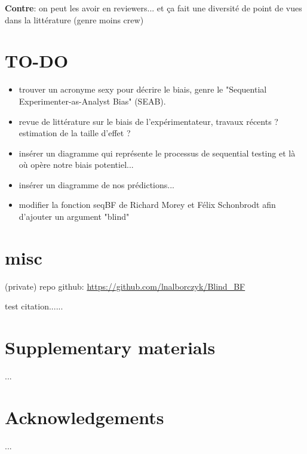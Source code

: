 \documentclass[a4paper,man,natbib]{apa6}
\begin{document}
\textbf{Contre}: on peut les avoir en reviewers... et ça fait une diversité de point de vues dans la littérature (genre moins crew)

\section{TO-DO}

\begin{itemize}

\item{trouver un acronyme sexy pour décrire le biais, genre le "Sequential Experimenter-as-Analyst Bias" (SEAB).}

\item{revue de littérature sur le biais de l'expérimentateur, travaux récents ? estimation de la taille d'effet ?}

\item{insérer un diagramme qui représente le processus de sequential testing et là où opère notre biais potentiel...}

\item{insérer un diagramme de nos prédictions...}

\item{modifier la fonction seqBF de Richard Morey et Félix Schonbrodt afin d'ajouter un argument "blind"} 

\end{itemize}

\section{misc}

(private) repo github: \url{https://github.com/lnalborczyk/Blind_BF}

test citation...\cite{kruschke_bayesian_2017}...

\section{Supplementary materials}

...

\section{Acknowledgements}

...



\end{document}
